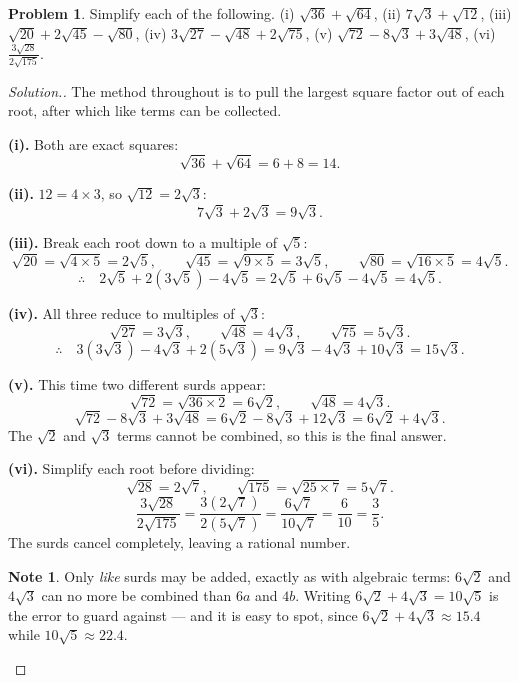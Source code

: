 \documentclass[11pt,a4paper]{article}
\theoremstyle{definition}
\newtheorem{note}[thm]{Note}
\newtheorem{problemx}{Problem}[section]
\newenvironment{problem}{\begin{problemx}}{\end{problemx}}
\newenvironment{solution}
  {\renewcommand{\qedsymbol}{}\begin{proof}[\textit{Solution}.]}
  {\end{proof}}
\begin{document}
\begin{problem}
Simplify each of the following.
\quad (i) $\sqrt{36}+\sqrt{64}$, \quad (ii) $7\sqrt{3}+\sqrt{12}$, \quad
(iii) $\sqrt{20}+2\sqrt{45}-\sqrt{80}$, \quad (iv) $3\sqrt{27}-\sqrt{48}+2\sqrt{75}$,
\quad (v) $\sqrt{72}-8\sqrt{3}+3\sqrt{48}$, \quad (vi) $\frac{3\sqrt{28}}{2\sqrt{175}}$.
\end{problem}

\begin{solution}
The method throughout is to pull the largest square factor out of each root, after which
like terms can be collected.

\textbf{(i).} Both are exact squares:
$$\sqrt{36}+\sqrt{64}=6+8=14.$$

\textbf{(ii).} $12=4\times 3$, so $\sqrt{12}=2\sqrt{3}$:
$$7\sqrt{3}+2\sqrt{3}=9\sqrt{3}.$$

\textbf{(iii).} Break each root down to a multiple of $\sqrt{5}$:
$$\sqrt{20}=\sqrt{4\times 5}=2\sqrt{5},\qquad
\sqrt{45}=\sqrt{9\times 5}=3\sqrt{5},\qquad
\sqrt{80}=\sqrt{16\times 5}=4\sqrt{5}.$$
$$\therefore\quad 2\sqrt{5}+2(3\sqrt{5})-4\sqrt{5}=2\sqrt{5}+6\sqrt{5}-4\sqrt{5}
=4\sqrt{5}.$$

\textbf{(iv).} All three reduce to multiples of $\sqrt{3}$:
$$\sqrt{27}=3\sqrt{3},\qquad \sqrt{48}=4\sqrt{3},\qquad \sqrt{75}=5\sqrt{3}.$$
$$\therefore\quad 3(3\sqrt{3})-4\sqrt{3}+2(5\sqrt{3})=9\sqrt{3}-4\sqrt{3}+10\sqrt{3}
=15\sqrt{3}.$$

\textbf{(v).} This time two different surds appear:
$$\sqrt{72}=\sqrt{36\times 2}=6\sqrt{2},\qquad \sqrt{48}=4\sqrt{3}.$$
$$\sqrt{72}-8\sqrt{3}+3\sqrt{48}=6\sqrt{2}-8\sqrt{3}+12\sqrt{3}=6\sqrt{2}+4\sqrt{3}.$$
The $\sqrt{2}$ and $\sqrt{3}$ terms cannot be combined, so this is the final answer.

\textbf{(vi).} Simplify each root before dividing:
$$\sqrt{28}=2\sqrt{7},\qquad \sqrt{175}=\sqrt{25\times 7}=5\sqrt{7}.$$
$$\frac{3\sqrt{28}}{2\sqrt{175}}=\frac{3\left(2\sqrt{7}\right)}{2\left(5\sqrt{7}\right)}
=\frac{6\sqrt{7}}{10\sqrt{7}}=\frac{6}{10}=\frac{3}{5}.$$
The surds cancel completely, leaving a rational number.

\begin{note}
Only \emph{like} surds may be added, exactly as with algebraic terms: $6\sqrt{2}$ and
$4\sqrt{3}$ can no more be combined than $6a$ and $4b$. Writing $6\sqrt{2}+4\sqrt{3}=
10\sqrt{5}$ is the error to guard against --- and it is easy to spot, since
$6\sqrt{2}+4\sqrt{3}\approx 15.4$ while $10\sqrt{5}\approx 22.4$.
\end{note}
\end{solution}
\end{document}
